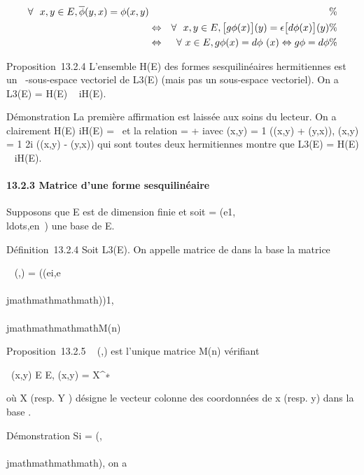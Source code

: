 \begin{align*} \forall~~x,y \in E,
\overline\phi(y,x) = \phi(x,y)&& \%&
\\ & \Leftrightarrow &
\forall~~x,y \in E, \big
{[}g\phi(x)\big {]}(y) = \epsilon\big
{[}d\phi(x)\big {]}(y)\%&
\\ & \Leftrightarrow &
\forall~x \in E, g\phi(x) = d\phi~(x)
\Leftrightarrow g\phi = d\phi \%&
\\ \end{align*}

Proposition~13.2.4 L'ensemble H(E) des formes sesquilinéaires
hermitiennes est un ~-sous-espace vectoriel de L3(E) (mais
pas un  sous-espace vectoriel). On a L3(E) = H(E) \oplus~ iH(E).

Démonstration La première affirmation est laissée aux soins du lecteur.
On a clairement H(E) \bigcap iH(E) = \0\ et
la relation \phi = \psi + i\theta avec \psi(x,y) = 1 
(\phi(x,y) + \phi(y,x)), \theta(x,y) = 1 \over 2i (\phi(x,y) -
\phi(y,x)) qui sont toutes deux hermitiennes montre que L3(E) =
H(E) \oplus~ iH(E).

\paragraph{13.2.3 Matrice d'une forme sesquilinéaire}

Supposons que E est de dimension finie et soit  =
(e1,\\ldots,en~)
une base de E.

Définition~13.2.4 Soit \phi \in L3(E). On appelle matrice de \phi
dans la base  la matrice

\mathrmMat~ (\phi,) =
(\phi(ei,e\\\\jmathmathmathmath))1\leqi,\\\\jmathmathmathmath\leqn \in M(n)

Proposition~13.2.5
\mathrmMat~ (\phi,) est
l'unique matrice \Omega \in M(n) vérifiant

\forall~(x,y) \in E \times E, \phi(x,y) = X^∗~\OmegaY

où X (resp. Y ) désigne le vecteur colonne des coordonnées de x (resp.
y) dans la base .

Démonstration Si \Omega = (\omegai,\\\\jmathmathmathmath), on a

